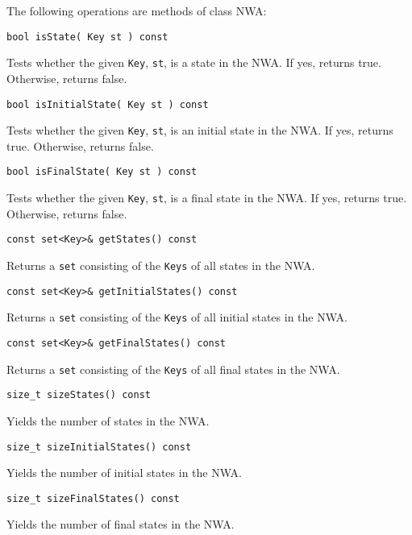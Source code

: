 \noindent The following operations are methods of class NWA:

\begin{description}

  \item\texttt{bool isState( Key st ) const} \nopagebreak

    Tests whether the given \texttt{Key}, \texttt{st}, is a state in the NWA.
    If yes, returns true.  Otherwise, returns false.

  \item\texttt{bool isInitialState( Key st ) const} \nopagebreak

    Tests whether the given \texttt{Key}, \texttt{st}, is an initial state in
    the NWA.  If yes, returns true.  Otherwise, returns false.

  \item\texttt{bool isFinalState( Key st ) const} \nopagebreak

    Tests whether the given \texttt{Key}, \texttt{st}, is a final state in
    the NWA.  If yes, returns true.  Otherwise, returns false.

  \item\texttt{const set<Key>\& getStates() const} \nopagebreak

    Returns a \texttt{set} consisting of the \texttt{Keys} of all states in
    the NWA.

  \item\texttt{const set<Key>\& getInitialStates() const} \nopagebreak

    Returns a \texttt{set} consisting of the \texttt{Keys} of all initial
    states in the NWA.

  \item\texttt{const set<Key>\& getFinalStates() const} \nopagebreak

    Returns a \texttt{set} consisting of the \texttt{Keys} of all final
    states in the NWA.

  \item\texttt{size\_t sizeStates() const} \nopagebreak

    Yields the number of states in the NWA.

  \item\texttt{size\_t sizeInitialStates() const} \nopagebreak

    Yields the number of initial states in the NWA.

  \item\texttt{size\_t sizeFinalStates() const} \nopagebreak

    Yields the number of final states in the NWA. \\

\end{description}

